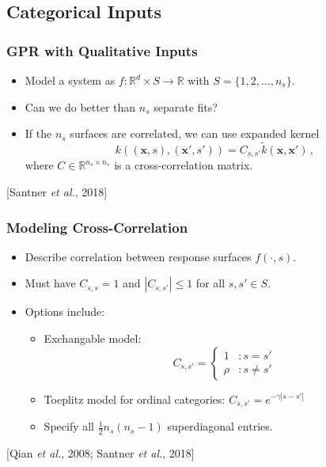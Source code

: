 \documentclass{beamer}
\newcommand{\R}{\mathbb{R}}
\newcommand{\vect}[1]{\boldsymbol{#1}}
\newcommand{\citeAY}[1]{
	\begin{flushright}
		{\footnotesize [#1]}
	\end{flushright}
}
\begin{document}
	\subsection{Categorical Inputs}
	\begin{frame}
		\frametitle{GPR with Qualitative Inputs}
		\begin{itemize}
			\item Model a system as $f:\R^d\times S\to\R$ with $S=\{1,2,\ldots,n_s\}$.
			\item Can we do better than $n_s$ separate fits?
			\item If the $n_s$ surfaces are correlated, we can use expanded kernel $$k\left((\vect{x},s),(\vect{x}',s')\right)=C_{s,s'}\tilde{k}(\vect{x},\vect{x}')\,,$$ where $C\in\R^{n_s\times n_s}$ is a cross-correlation matrix.
		\end{itemize}
		\citeAY{Santner \emph{et al.}, 2018}
	\end{frame}
	
	\begin{frame}
		\frametitle{Modeling Cross-Correlation}
		\begin{itemize}
			\item Describe correlation between response surfaces $f(\cdot,s)$.
			\item Must have $C_{s,s}=1$ and $|C_{s,s'}|\leq1$ for all $s,s'\in S$.
			\item Options include:
			\begin{itemize}
				\item Exchangable model:
				\begin{equation*}
					C_{s,s'}=\left\{
					\begin{array}{cl}
						1 & : s=s'\\
						\rho & : s\neq s'
					\end{array}\right.
				\end{equation*}
				\item Toeplitz model for ordinal categories: $C_{s,s'}=e^{-\gamma|s-s'|}$ %
				\item Specify all $\tfrac{1}{2}n_s(n_s-1)$ superdiagonal entries.
			\end{itemize}
		\end{itemize}
		\citeAY{Qian \emph{et al.}, 2008; Santner \emph{et al.}, 2018}
	\end{frame}
	
\end{document}
